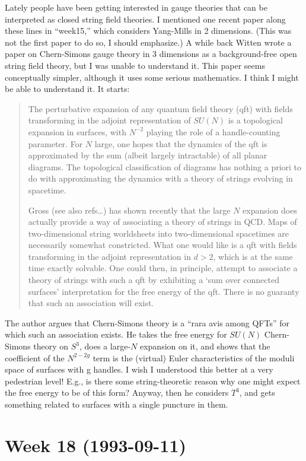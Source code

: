 \documentclass{article}
\def\tightlist{}
\renewcommand{\texttt}[1]{%
  \begingroup
  \ttfamily
  \begingroup\lccode`~=`/\lowercase{\endgroup\def~}{/\discretionary{}{}{}}%
  \begingroup\lccode`~=`[\lowercase{\endgroup\def~}{[\discretionary{}{}{}}%
  \begingroup\lccode`~=`.\lowercase{\endgroup\def~}{.\discretionary{}{}{}}%
  \catcode`/=\active\catcode`[=\active\catcode`.=\active
  \scantokens{#1\noexpand}%
  \endgroup
}
\begin{document}

Lately people have been getting interested in gauge theories that can be
interpreted as closed string field theories. I mentioned one recent
paper along these lines in ``week15,'' which considers Yang-Mills in 2
dimensions. (This was not the first paper to do so, I should emphasize.)
A while back Witten wrote a paper on Chern-Simons gauge theory in 3
dimensions as a background-free open string field theory, but I was
unable to understand it. This paper seems conceptually simpler, although
it uses some serious mathematics. I think I might be able to understand
it. It starts:

\begin{quote}
The perturbative expansion of any quantum field theory (qft) with fields
transforming in the adjoint representation of \(SU(N)\) is a topological
expansion in surfaces, with \(N^{-2}\) playing the role of a
handle-counting parameter. For \(N\) large, one hopes that the dynamics
of the qft is approximated by the sum (albeit largely intractable) of
all planar diagrams. The topological classification of diagrams has
nothing a priori to do with approximating the dynamics with a theory of
strings evolving in spacetime.

Gross (see also refs\ldots) has shown recently that the large \(N\)
expansion does actually provide a way of associating a theory of strings
in QCD. Maps of two-dimensional string worldsheets into two-dimensional
spacetimes are necessarily somewhat constricted. What one would like is
a qft with fields transforming in the adjoint representation in
\(d > 2\), which is at the same time exactly solvable. One could then,
in principle, attempt to associate a theory of strings with such a qft
by exhibiting a `sum over connected surfaces' interpretation for the
free energy of the qft. There is no guaranty that such an association
will exist.
\end{quote}

The author argues that Chern-Simons theory is a ``rara avis among QFTs''
for which such an association exists. He takes the free energy for
\(SU(N)\) Chern-Simons theory on \(S^3\), does a large-\(N\) expansion
on it, and shows that the coefficient of the \(N^{2-2g}\) term is the
(virtual) Euler characteristics of the moduli space of surfaces with g
handles. I wish I understood this better at a very pedestrian level!
E.g., is there some string-theoretic reason why one might expect the
free energy to be of this form? Anyway, then he considers \(T^3\), and
gets something related to surfaces with a single puncture in them.
\hypertarget{week-18-1993-09-11}{%
\section{Week 18 (1993-09-11)}\label{week-18-1993-09-11}}
\end{document}
